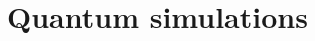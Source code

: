 \documentclass[thesis]{subfiles}
\begin{document}
\OnlyInSubfile{\setcounter{chapter}{3}}

\chapter{Quantum simulations}
\startcontents[chapters]
\printpartialtoc

%
%
%
%
\end{document}
